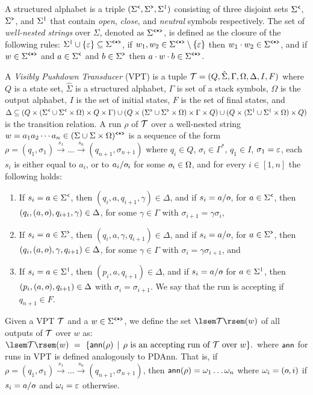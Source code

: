 %
%

A structured alphabet is a triple $(\Sigma^{\texttt{<}}, \Sigma^{\texttt{>}}, \Sigma^{\texttt{|}})$ consisting of three disjoint sets $\Sigma^{\texttt{<}}$, $\Sigma^{\texttt{>}}$, and $\Sigma^{\texttt{|}}$ that contain {\it open}, {\it close}, and {\it neutral} symbols respectively.
%
%
The set of {\em well-nested strings}
over $\Sigma$, denoted as $\Sigma^{\texttt{<*>}}$, is defined as the closure of the following rules: 
$\Sigma^{\texttt{|}} \cup \{\varepsilon\} \subseteq \Sigma^{\texttt{<*>}}$,
if $w_1, w_2 \in \Sigma^{\texttt{<*>}}\setminus\{\varepsilon\}$ then $w_1 \cdot w_2 \in \Sigma^{\texttt{<*>}}$, and if $w \in \Sigma^{\texttt{<*>}}$ and $a \in \Sigma^{\texttt{<}}$ and $b \in \Sigma^{\texttt{>}}$ then $a\cdot w\cdot b \in \Sigma^{\texttt{<*>}}$. 
%
%

A \emph{Visibly Pushdown Transducer} (VPT) is a tuple $\mathcal{T} = (Q, \hat{\Sigma}, \Gamma, \Omega, \Delta, I, F)$ where $Q$ is a state set, $\hat{\Sigma}$ is a structured alphabet, $\Gamma$ is set of a stack symbols, $\Omega$ is the output alphabet, $I$ is the set of initial states, $F$ is the set of final states, and 
$
%
%
%
%
%
%
\Delta \subseteq  
(Q \times (\opS \cup \opS \times \Omega) \times Q \times \Gamma)  \cup 
(Q \times (\clS \cup \clS \times \Omega) \times \Gamma \times Q)  \cup 
(Q \times (\noS \cup \noS \times \Omega) \times Q)
$
is the transition relation.
A run $\rho$ of $\mathcal{T}$ over a well-nested string $w = a_1 a_2\cdots a_n \in(\Sigma\cup\Sigma\times\Omega)^{\texttt{<*>}}$ %
is a sequence of the form
$
%
\rho = (q_1, \sigma_1) \xrightarrow{s_1} \ldots  \xrightarrow{s_n} (q_{n+1}, \sigma_{n+1})
$
where $q_i \in Q$, $\sigma_i\in \Gamma^{*}$, $q_1 \in I$, $\sigma_1 = \varepsilon$, each $s_i$ is either equal to $a_i$, or to $a_i/\!\oout_i$ for some $\oout_i\in\Omega$, and for every $i\in[1,n]$ the following holds:
\begin{enumerate}
  \item If $s_{i} = a\in \Sigma^{\texttt{<}}$, then $(q_i, a,q_{i+1},\gamma) \in \Delta$, and if $s_i = a/\!\oout$, for $a\in \Sigma^{\texttt{<}}$, then $(q_i, (a,\oout),q_{i+1},\gamma) \in \Delta$, for some $\gamma\in\Gamma$ with $\sigma_{i+1} = \gamma\sigma_i$,
  \item If $s_{i} = a\in\Sigma^{\texttt{>}}$, then $(q_i, a, \gamma, q_{i+1}) \in \Delta$, and if $s_i = a/\!\oout$, for $a\in \Sigma^{\texttt{>}}$, then $(q_i, (a, \oout), \gamma, q_{i+1}) \in \Delta$, for some $\gamma\in\Gamma$ with $\sigma_i = \gamma\sigma_{i+1}$, and
  \item If $s_i = a\in\Sigma^{\texttt{|}}$, then $(p_i, a,q_{i+1})\in \Delta$, and if $s_i = a/\!\oout$ for $a\in\Sigma^{\texttt{|}}$, then $(p_i, (a,\oout),q_{i+1})\in \Delta$ with $\sigma_i = \sigma_{i+1}$. We say that the run is accepting if $q_{n+1}\in F$.
\end{enumerate}
Given a VPT $\mathcal{T}$ and a $w \in\Sigma^{\texttt{<*>}}$, we define the set $\sem{\cT}(w)$ of all outputs of $\mathcal{T}$ over $w$ as:
$
\sem{\cT}(w) \ = \ \{ \ann(\rho) \, \mid \, \text{$\rho$ is an accepting run of $\cT$ over $w$}\}.
$
where $\mathsf{ann}$ for runs in VPT is defined analogously to PDAnn. That is, if $\rho = (q_1, \sigma_1) \xrightarrow{s_1} \ldots  \xrightarrow{s_n} (q_{n+1}, \sigma_{n+1})$, then $\mathsf{ann}(\rho) = \omega_1\ldots\omega_n$ where $\omega_i = (\oout, i)$ if $s_i = a/\!\oout$ and $\omega_i = \varepsilon$ otherwise.

